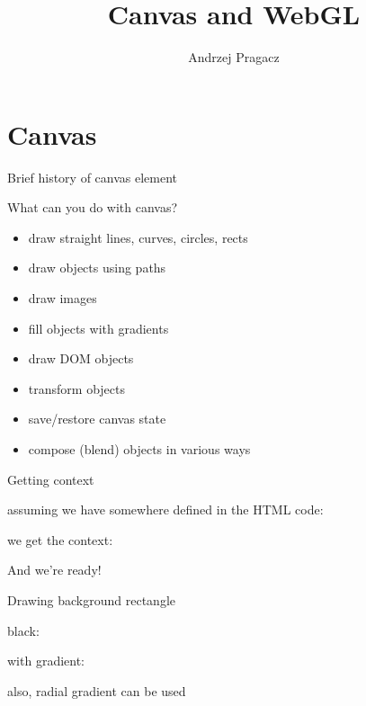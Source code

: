 \documentclass{beamer}
\title{Canvas and WebGL}
\author{Andrzej Pragacz}
\begin{document}
\titlepage

\section{Canvas}

\begin{frame}{Brief history of canvas element}
\end{frame}

\begin{frame}{What can you do with canvas?}
\begin{itemize}
    \item draw straight lines, curves, circles, rects
    \item draw objects using paths
    \item draw images
    \item fill objects with gradients
    \item draw DOM objects
    \item transform objects
    \item save/restore canvas state
    \item compose (blend) objects in various ways
\end{itemize}
\end{frame}


\begin{frame}{Getting context}

assuming we have somewhere defined in the HTML code:

\lstset{ language=HTML, basicstyle=\scriptsize,frame=single}


we get the context:



And we're ready!

\end{frame}


\begin{frame}{Drawing background rectangle}

black:



with gradient:



also, radial gradient can be used

\end{frame}
\end{document}
